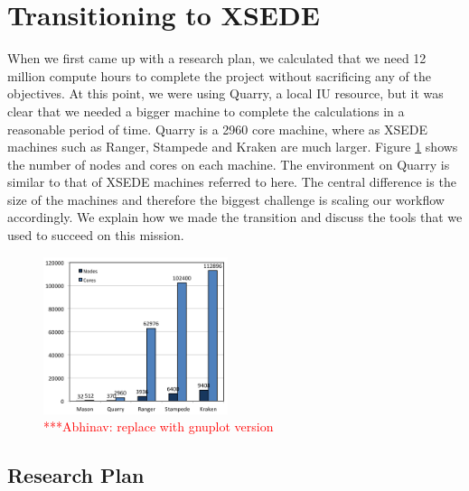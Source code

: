 \documentclass{sig-alternate}
\newcommand{\abhi}[1]{ {\textcolor{red} { ***Abhinav: #1 }}}
\newcommand{\abhi}[1]{ {}}
\begin{document}
\section{Transitioning to XSEDE}\label{sec:resources}
When we first came up with a research plan, we calculated that we need 12 million compute hours to complete the project without sacrificing any of the objectives. At this point, we were using Quarry, a local IU resource, but it was clear that we needed a bigger machine to complete the calculations in a reasonable period of time. Quarry is a 2960 core machine, where as XSEDE machines such as Ranger, Stampede and Kraken are much larger. Figure \ref{fig:scaling} shows the number of nodes and cores on each machine. The environment on Quarry is similar to that of XSEDE machines referred to here. The central difference is the size of the machines and therefore the biggest challenge is scaling our workflow accordingly. We explain how we made the transition and discuss the tools that we used to succeed on this mission.
%


\begin{figure} %
\centering
\includegraphics[width=0.48\textwidth]{figures/cores-nodes.png}
\caption{\abhi{replace with gnuplot version}}
\label{fig:scaling}
\end{figure}

\subsection{Research Plan}\label{sec:plan}
\end{document}
